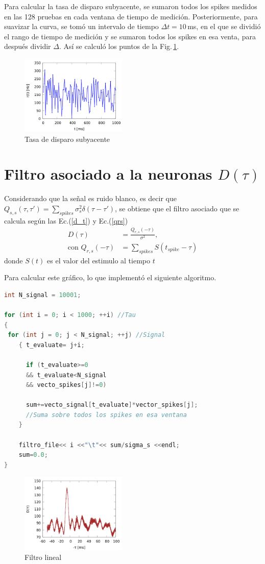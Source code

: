 Para calcular la tasa de disparo subyacente,  se sumaron todos los spikes medidos en las 128 pruebas en cada ventana de tiempo de medición. Posteriormente, para suavizar la curva, se tomó un intervalo de tiempo $\Delta t = 10\,$ms, en el que se dividió el rango de tiempo de medición y se sumaron todos los spikes en esa venta, para después dividir $\Delta$. Así se calculó los puntos de la Fig.\,\ref{r_t}.


\begin{figure}[H]
	\centering
	\includegraphics[width=0.45\textwidth]{../Graficos/r_t.png}
	\caption{Tasa de disparo subyacente}
	\label{r_t}
\end{figure}

\section*{Filtro asociado a la neuronas \texorpdfstring{$D(\tau)$}{}}


Considerando que la señal es ruido blanco, es decir que $Q_{s,s}(\tau, \tau')= \sum_{spikes} \sigma^2_s \delta(\tau-\tau')$, se obtiene que el filtro asociado que se  calcula  según las Ec.(\ref{d_t}) y Ec.(\ref{qrs}) 
\begin{align}
    D(\tau) &= \frac{Q_{r,s}(-\tau)}{\sigma^2}, \label{d_t}\\
    \text{con } Q_{r,s}(-\tau) &= \sum_{spikes} S(t_{spike} - \tau) \label{qrs}
\end{align}
donde $S(t)$ es el valor del estimulo al tiempo $t$

Para calcular este gráfico, lo que implementó  el siguiente algoritmo.

\begin{lstlisting}[language=C++]
int N_signal = 10001;

for (int i = 0; i < 1000; ++i) //Tau
{
 for (int j = 0; j < N_signal; ++j) //Signal
	{ t_evaluate= j+i;
	  
	  if (t_evaluate>=0 
	  && t_evaluate<N_signal 
	  && vecto_spikes[j]!=0) 

	  sum+=vecto_signal[t_evaluate]*vector_spikes[j];
	  //Suma sobre todos los spikes en esa ventana
	}
	
	filtro_file<< i <<"\t"<< sum/sigma_s <<endl;
	sum=0.0;
}
\end{lstlisting}


\begin{figure}[H]
	\centering
	\includegraphics[width=0.45\textwidth]{../Graficos/D_tau.png}
	\caption{Filtro lineal}
\end{figure}




